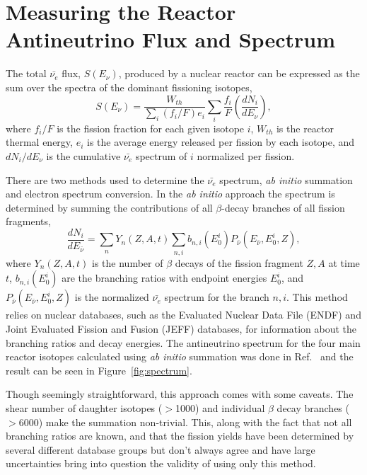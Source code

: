 \section{Measuring the Reactor Antineutrino Flux and Spectrum}

The total $\bar{\nu_{e}}$ flux, $S(E_\nu)$, produced by a nuclear reactor can be expressed as the sum over the spectra of the dominant fissioning isotopes,
\begin{equation}
	S(E_\nu) = \frac{W_{th}}{\sum_{i}(f_i/F)e_i}\sum_{i}\frac{f_i}{F}\left(\frac{dN_i}{dE_\nu}\right) ,
\end{equation}
where $f_i/F$ is the fission fraction for each given isotope $i$, $W_{th}$ is the reactor thermal energy, $e_i$ is the 
average energy released per fission by each isotope, and $dN_i/dE_\nu$ is the cumulative $\bar{\nu_e}$ spectrum of $i$ normalized per fission.

There are two methods used to determine the $\bar{\nu_e}$ spectrum, \textit{ab initio} summation and electron spectrum conversion.
In the \textit{ab initio} approach the spectrum is determined by summing the contributions of all $\beta$-decay branches of all fission fragments,
\begin{equation}
	\frac{dN_i}{dE_{\bar{\nu}}} =  \sum_{n}Y_n(Z,A,t)\sum_{n,i}b_{n,i}(E^i_0)P_{\bar{\nu}}(E_{\bar{\nu}},E^i_0,Z) ,
\end{equation}
where $Y_n(Z,A,t)$ is the number of $\beta$ decays of the fission fragment $Z, A$ at time $t$, $b_{n,i}(E^i_0)$ are the branching ratios with endpoint energies $E^i_0$, and $P_{\bar{\nu}}(E_{\bar{\nu}},E^i_0,Z)$ is the normalized $\bar{\nu_e}$ spectrum for the branch $n, i$.
This method relies on nuclear databases, such as the Evaluated Nuclear Data File (ENDF) and Joint Evaluated Fission and Fusion (JEFF) databases, for information about the branching ratios and decay energies. 
The antineutrino spectrum for the four main reactor isotopes calculated using \textit{ab initio} summation was done in Ref.~\cite{HayesVogel} and the result can be seen in Figure~\ref{fig:spectrum}. 

Though seemingly straightforward, this approach comes with some caveats.
The shear number of daughter isotopes ($>$1000) and individual $\beta$ decay branches ($>$6000) make the summation non-trivial.
This, along with the fact that not all branching ratios are known, and that the fission yields have been determined by several different database groups but don't always agree and have large uncertainties bring into question the validity of using only this method. 

